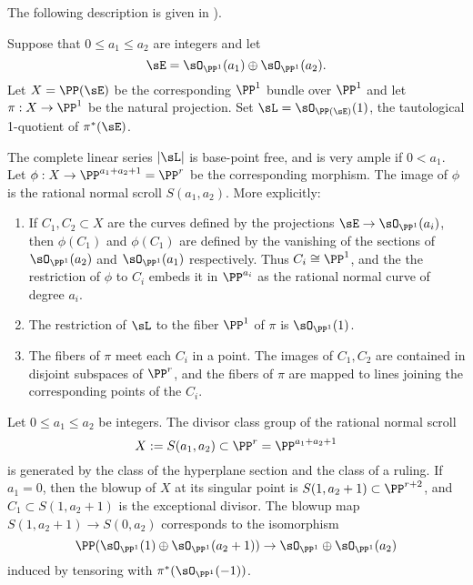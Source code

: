 The following description is  given in  \cite[Proposition V.2.2 and V.2.3]{Hartshorne1977}).

\begin{theorem} 
Suppose that $0\leq a_1\leq a_2$ are integers and let 
$$
\sE = \sO_{\PP^1}(a_1) \oplus \sO_{\PP^1}(a_2).
$$
 Let $X = \PP(\sE)$  be the corresponding $\PP^1$ bundle over $\PP^1$
and let $\pi: X \to \PP^1$ be the natural projection. Set $\sL =   \sO_{\PP(\sE)}(1)$, the tautological 1-quotient of $\pi^*(\sE)$.

The complete linear series $|\sL|$ is base-point free, and is very ample if $0<a_1$. 
Let $\phi:X\to \PP^{a_1+a_2+1} = \PP^r$ be the corresponding morphism. The image of $\phi$ is the rational normal scroll $S(a_1,a_2).$
More explicitly:
\begin{enumerate}
 \item If $C_1, C_2\subset X$ are the curves defined by the projections $\sE \to \sO_{\PP^1}(a_i)$, then $\phi(C_1)$ and $\phi(C_1)$
 are defined by the vanishing
of the sections of $\sO_{\PP^1}(a_2)$ and  $\sO_{\PP^1}(a_1)$ respectively. Thus $C_i \cong \PP^1$,
and the the restriction of $\phi$ to $C_i$ embeds it in $\PP^{a_i}$ as the rational normal curve of degree $a_i$.

\item The restriction of $\sL$ to the fiber $\PP^1$ of $\pi$ is $\sO_{\PP^1}(1)$.

\item The fibers of $\pi$ meet each $C_i$ in a point. The images of $C_1, C_2$ are contained in disjoint subspaces of $\PP^r$, and the fibers of $\pi$ are mapped 
to lines joining the corresponding points of the $C_i$.
\end{enumerate}
\end{theorem}


\begin{corollary}\cite[Section V.2]{Hartshorne1977}
Let $0\leq a_1\leq a_2$ be integers. The divisor class group of the 
rational normal scroll 
$$
X:=S(a_1,a_2) \subset \PP^r = \PP^{a_1+a_2+1}
$$
is generated by the class of the hyperplane section and the class
of a ruling. If $a_1 = 0$, then the blowup of $X$ at its singular point is $S(1, a_2+1)\subset \PP^{r+2}$,
and $C_1\subset S(1, a_2+1)$ is the exceptional divisor. The blowup map $S(1, a_2+1) \to S(0,a_2)$
corresponds to the isomorphism 
$$
\PP(\sO_{\PP^1}(1) \oplus \sO_{\PP^1}(a_2+1)) \to \sO_{\PP^1} \oplus \sO_{\PP^1}(a_2)
$$
induced by tensoring with $\pi^*(\sO_{\PP^1}(-1))$.
\end{corollary}

